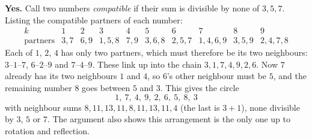 \textbf{Yes.} Call two numbers \emph{compatible} if their sum is divisible by none of $3,5,7$. Listing the compatible partners of each number:
\[
\begin{array}{c|ccccccccc}
k&1&2&3&4&5&6&7&8&9\\\hline
\text{partners}&3,7&6,9&1,5,8&7,9&3,6,8&2,5,7&1,4,6,9&3,5,9&2,4,7,8
\end{array}
\]
Each of $1$, $2$, $4$ has only two partners, which must therefore be its two neighbours: $3$--$1$--$7$, $6$--$2$--$9$ and $7$--$4$--$9$. These link up into the chain $3,1,7,4,9,2,6$. Now $7$ already has its two neighbours $1$ and $4$, so $6$'s other neighbour must be $5$, and the remaining number $8$ goes between $5$ and $3$. This gives the circle
\[
\boxed{1,\ 7,\ 4,\ 9,\ 2,\ 6,\ 5,\ 8,\ 3}
\]
with neighbour sums $8,11,13,11,8,11,13,11,4$ (the last is $3+1$), none divisible by $3$, $5$ or $7$. The argument also shows this arrangement is the only one up to rotation and reflection.
